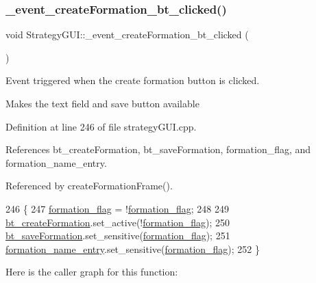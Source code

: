 \subsubsection{\texorpdfstring{\+\_\+event\+\_\+create\+Formation\+\_\+bt\+\_\+clicked()}{\_event\_createFormation\_bt\_clicked()}}
{\footnotesize\ttfamily void Strategy\+G\+U\+I\+::\+\_\+event\+\_\+create\+Formation\+\_\+bt\+\_\+clicked (\begin{DoxyParamCaption}{ }\end{DoxyParamCaption})\hspace{0.3cm}{\ttfamily [private]}}



Event triggered when the \textquotesingle{}create formation\textquotesingle{} button is clicked. 

Makes the text field and \textquotesingle{}save\textquotesingle{} button available 

Definition at line 246 of file strategy\+G\+U\+I.\+cpp.



References bt\+\_\+create\+Formation, bt\+\_\+save\+Formation, formation\+\_\+flag, and formation\+\_\+name\+\_\+entry.



Referenced by create\+Formation\+Frame().


\begin{DoxyCode}
246                                                     \{
247     \hyperlink{class_strategy_g_u_i_aaac145125516fb8b7fe7137db18cdb58}{formation\_flag} = !\hyperlink{class_strategy_g_u_i_aaac145125516fb8b7fe7137db18cdb58}{formation\_flag};
248 
249     \hyperlink{class_strategy_g_u_i_ab6edc11fb98709c98ad1815998aa937a}{bt\_createFormation}.set\_active(!\hyperlink{class_strategy_g_u_i_aaac145125516fb8b7fe7137db18cdb58}{formation\_flag});
250     \hyperlink{class_strategy_g_u_i_ae68d7475f55a82e46d74eb8b3cd53b9e}{bt\_saveFormation}.set\_sensitive(\hyperlink{class_strategy_g_u_i_aaac145125516fb8b7fe7137db18cdb58}{formation\_flag});
251     \hyperlink{class_strategy_g_u_i_a19406b76eaf73c06545aa1c67c0636ce}{formation\_name\_entry}.set\_sensitive(\hyperlink{class_strategy_g_u_i_aaac145125516fb8b7fe7137db18cdb58}{formation\_flag});
252 \}
\end{DoxyCode}
Here is the caller graph for this function\+:
\mbox{\label{class_strategy_g_u_i_a5301539a6dc0b88cf402bf62d372c8fb}} 
